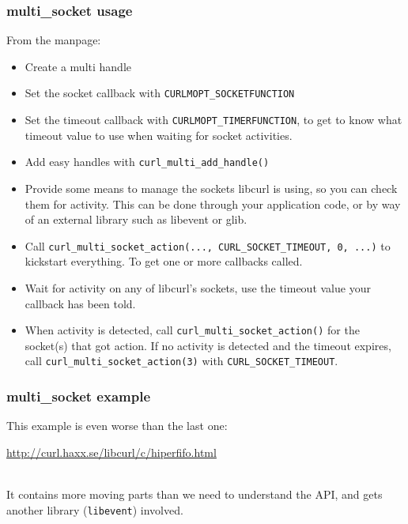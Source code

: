 \begin{frame}

  \frametitle{multi\_socket usage}


From the manpage:
\small
\begin{itemize}
\item Create a multi handle

\item Set the socket callback with {\tt CURLMOPT\_SOCKETFUNCTION}

\item Set the timeout callback with {\tt CURLMOPT\_TIMERFUNCTION}, to get to know what timeout value to use when waiting for socket activities.

\item Add easy handles with {\tt curl\_multi\_add\_handle()}

\item Provide some means to manage the sockets libcurl is using, so you can check them for activity. This can be done through your application code, or by way of an external library such as libevent or glib.

\item Call {\tt curl\_multi\_socket\_action(..., CURL\_SOCKET\_TIMEOUT, 0, ...)} to kickstart everything. To get one or more callbacks called.

\item Wait for activity on any of libcurl's sockets, use the timeout value your callback has been told.

\item When activity is detected, call {\tt curl\_multi\_socket\_action()} for the socket(s) that got action. If no activity is detected and the timeout expires, call {\tt curl\_multi\_socket\_action(3)} with {\tt CURL\_SOCKET\_TIMEOUT}. 
\end{itemize}
  

\end{frame}

\begin{frame}

  \frametitle{multi\_socket example}


This example is even worse than the last one:
\begin{center}
\url{http://curl.haxx.se/libcurl/c/hiperfifo.html}
\end{center}~\\[1em]
It contains more moving parts than we need to understand the API, and gets
another library ({\tt libevent}) involved.

\end{frame}

